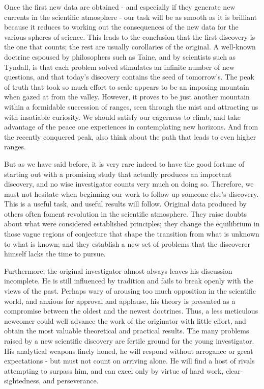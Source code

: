 \documentclass{article}
\begin{document}
Once the first new data are obtained - and especially if they generate new currents in the scientific atmosphere - our task will be as smooth as it is brilliant because it reduces to working out the consequences of the new data for the various spheres of science. This leads to the conclusion that the first discovery is the one that counts; the rest are usually corollaries of the original. A well-known doctrine espoused by philosophers such as Taine, and by scientists such as Tyndall, is that each problem solved stimulates an infinite number of new questions, and that today’s discovery contains the seed of tomorrow’s. The peak of truth that took so much effort to scale appears to be an imposing mountain when gazed at from the valley. However, it proves to be just another mountain within a formidable succession of ranges, seen through the mist and attracting us with insatiable curiosity. We should satisfy our eagerness to climb, and take advantage of the peace one experiences in contemplating new horizons. And from the recently conquered peak, also think about the path that leads to even higher ranges.

But as we have said before, it is very rare indeed to have the good fortune of starting out with a promising study that actually produces an important discovery, and no wise investigator counts very much on doing so. Therefore, we must not hesitate when beginning our work to follow up someone else’s discovery. This is a useful task, and useful results will follow. Original data produced by others often foment revolution in the scientific atmosphere. They raise doubts about what were considered established principles; they change the equilibrium in those vague regions of conjecture that shape the transition from what is unknown to what is known; and they establish a new set of problems that the discoverer himself lacks the time to pursue.

Furthermore, the original investigator almost always leaves his discussion incomplete. He is still influenced by tradition and fails to break openly with the views of the past. Perhaps wary of arousing too much opposition in the scientific world, and anxious for approval and applause, his theory is presented as a compromise between the oldest and the newest doctrines. Thus, a less meticulous newcomer could well advance the work of the originator with little effort, and obtain the most valuable theoretical and practical results. The many problems raised by a new scientific discovery are fertile ground for the young investigator. His analytical weapons finely honed, he will respond without arrogance or great expectations - but must not count on arriving alone. He will find a host of rivals attempting to surpass him, and can excel only by virtue of hard work, clear-sightedness, and perseverance.
\end{document}
